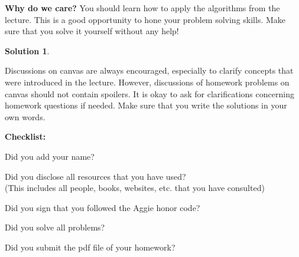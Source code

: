 \documentclass{article}
\theoremstyle{definition}
\newtheorem*{solution}{Solution}
\newcommand{\checklist}{\noindent\textbf{Checklist:}
\begin{compactitem}[$\Box$] 
\item Did you add your name? 
\item Did you disclose all resources that you have used? \\
(This includes all people, books, websites, etc. that you have consulted)
\item Did you sign that you followed the Aggie honor code? 
\item Did you solve all problems? 
\item Did you submit the pdf file of your homework?
\end{compactitem}
}
\begin{document}
{\small \textbf{Why do we care?} You should learn how to apply the
  algorithms from the lecture. This is a good opportunity to hone
  your problem solving skills. Make sure that you solve it yourself
  without any help!} 

\begin{solution}
\end{solution}



Discussions on canvas are always encouraged, especially to clarify
concepts that were introduced in the lecture. However, discussions of
homework problems on canvas should not contain spoilers. It is okay to
ask for clarifications concerning homework questions if needed. Make
sure that you write the solutions in your own words. 


\medskip



\goodbreak
\checklist
\end{document}
